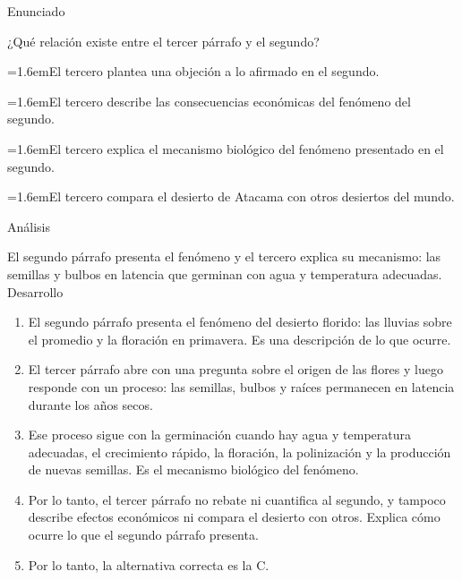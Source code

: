 \documentclass[10pt,a4paper,twocolumn]{article}
\newcommand{\alternativa}[2]{\par\noindent\hangindent=1.6em\hangafter=1\makebox[1.6em][l]{\tecla{#1}}#2\par}
\newcommand{\clave}[1]{\par\smallskip{\sffamily\footnotesize\color{esmeralda} Clave \teclaok{#1}}\par}
\begin{document}
\begin{ejemplo}
{\sffamily\footnotesize\color{zinc500} Enunciado}\par
¿Qué relación existe entre el tercer párrafo y el segundo?
\alternativa{A}{El tercero plantea una objeción a lo afirmado en el segundo.}
\alternativa{B}{El tercero describe las consecuencias económicas del fenómeno del segundo.}
\alternativa{C}{El tercero explica el mecanismo biológico del fenómeno presentado en el segundo.}
\alternativa{D}{El tercero compara el desierto de Atacama con otros desiertos del mundo.}
\clave{C}
{\sffamily\footnotesize\color{zinc500} Análisis}\par El segundo párrafo presenta el fenómeno y el tercero explica su mecanismo: las semillas y bulbos en latencia que germinan con agua y temperatura adecuadas.
{\sffamily\footnotesize\color{zinc500} Desarrollo}
\begin{enumerate}
  \item El segundo párrafo presenta el fenómeno del desierto florido: las lluvias sobre el promedio y la floración en primavera. Es una descripción de lo que ocurre.
  \item El tercer párrafo abre con una pregunta sobre el origen de las flores y luego responde con un proceso: las semillas, bulbos y raíces permanecen en latencia durante los años secos.
  \item Ese proceso sigue con la germinación cuando hay agua y temperatura adecuadas, el crecimiento rápido, la floración, la polinización y la producción de nuevas semillas. Es el mecanismo biológico del fenómeno.
  \item Por lo tanto, el tercer párrafo no rebate ni cuantifica al segundo, y tampoco describe efectos económicos ni compara el desierto con otros. Explica cómo ocurre lo que el segundo párrafo presenta.
  \item Por lo tanto, la alternativa correcta es la C.
\end{enumerate}
\end{ejemplo}
\end{document}
